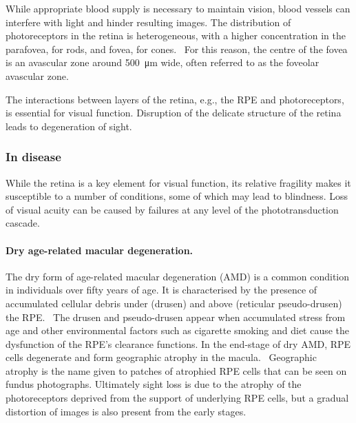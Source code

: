 \documentclass{article}
\begin{document}
While appropriate blood supply is necessary to maintain vision, blood vessels can interfere with light and hinder resulting images.
The distribution of photoreceptors in the retina is heterogeneous, with a higher concentration in the parafovea, for rods, and fovea, for cones.~\cite{Zouache_2022}
For this reason, the centre of the fovea is an avascular zone around \SI{500}{\micro\meter} wide, often referred to as the foveolar avascular zone.

The interactions between layers of the retina, e.g., the RPE and photoreceptors, is essential for visual function.
Disruption of the delicate structure of the retina leads to degeneration of sight.

\subsubsection*{In disease}

While the retina is a key element for visual function, its relative fragility makes it susceptible to a number of conditions, some of which may lead to blindness.
Loss of visual acuity can be caused by failures at any level of the phototransduction cascade.\\

\paragraph*{Dry age-related macular degeneration.}
The dry form of age-related macular degeneration (AMD) is a common condition in individuals over fifty years of age.
It is characterised by the presence of accumulated cellular debris under (drusen) and above (reticular pseudo-drusen) the RPE.~\cite{Bottos_2012}
The drusen and pseudo-drusen appear when accumulated stress from age and other environmental factors such as cigarette smoking and diet cause the dysfunction of the RPE's clearance functions.
In the end-stage of dry AMD, RPE cells degenerate and form geographic atrophy in the macula.~\cite{Jager_2008}
Geographic atrophy is the name given to patches of atrophied RPE cells that can be seen on fundus photographs.
Ultimately sight loss is due to the atrophy of the photoreceptors deprived from the support of underlying RPE cells, but a gradual distortion of images is also present from the early stages.~\cite{Newsom_2008,Zacks_2022}\\
\end{document}
